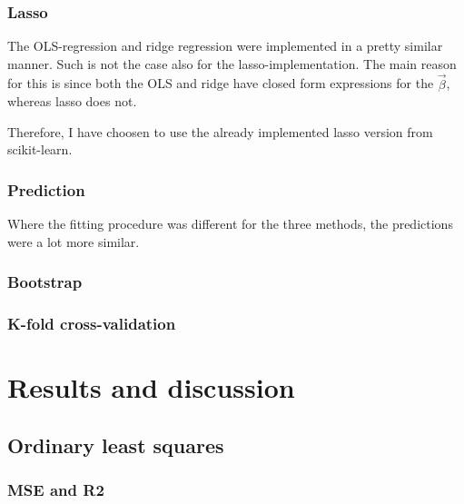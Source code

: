 \documentclass[12pt]{article}
\newcommand{\bbeta}{\vec{\beta}}
\begin{document}
\subsubsection{Lasso}

The OLS-regression and ridge regression were implemented in a pretty similar manner.
Such is not the case also for the lasso-implementation.
The main reason for this is since both the OLS and ridge have closed form expressions for the $\bbeta$, whereas lasso does not.

Therefore, I have choosen to use the already implemented lasso version from scikit-learn.

\subsubsection{Prediction}

Where the fitting procedure was different for the three methods, the predictions were a lot more similar.


\subsubsection{Bootstrap}

\subsubsection{K-fold cross-validation}

\section{Results and discussion}

\subsection{Ordinary least squares}

\subsubsection{MSE and R2}
\end{document}
